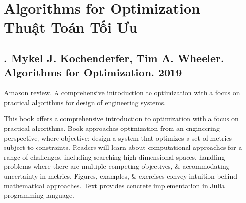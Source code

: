 \documentclass{article}
\begin{document}
\section{Algorithms for Optimization -- Thuật Toán Tối Ưu}

\subsection{\cite{Kochenderfer_Wheeler2019}. {\sc Mykel J. Kochenderfer, Tim A. Wheeler}. Algorithms for Optimization. 2019}
{}

{\sf Amazon review.} A comprehensive introduction to optimization with a focus on practical algorithms for design of engineering systems.

This book offers a comprehensive introduction to optimization with a focus on practical algorithms. Book approaches optimization from an engineering perspective, where objective: design a system that optimizes a set of metrics subject to constraints. Readers will learn about computational approaches for a range of challenges, including searching high-dimensional spaces, handling problems where there are multiple competing objectives, \& accommodating uncertainty in metrics. Figures, examples, \& exercises convey intuition behind mathematical approaches. Text provides concrete implementation in Julia programming language.
\end{document}

